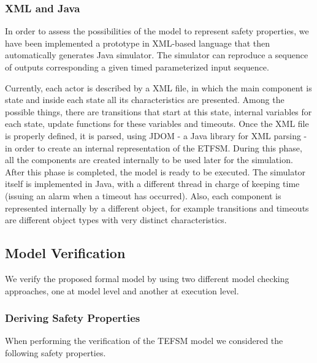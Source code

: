 \documentclass{template/openetcs_article}
\begin{document}
\subsubsection{XML and Java}

In order to assess the possibilities of the model to represent safety properties, we have been implemented a prototype in XML-based language that then automatically generates Java simulator.
%
The simulator can reproduce a sequence of outputs corresponding a given timed parameterized input sequence. 

Currently, each actor is described by a XML file, in which the main component is state and inside each state all its characteristics are presented. Among the possible things, there are transitions that start at this state, internal variables for each state, update functions for these variables and timeouts.  
Once the XML file is properly defined, it is parsed, using JDOM - a Java library for XML parsing -  in order to create an internal representation of the ETFSM. During this phase, all the components are created internally to be used later for the simulation. After this phase is completed, the model is ready to be executed. The simulator itself is implemented in Java, with a different thread in charge of keeping time (issuing an alarm when a timeout has occurred). Also, each component is represented internally by a different object, for example transitions and timeouts are different object types with very distinct characteristics. 

\subsection{Model Verification}
\label{sec:model-checking}

We verify the proposed formal model by using two different model checking approaches, one at model level and another at execution level.


\subsubsection{Deriving Safety Properties}
\label{subsec3.1}

When performing the verification of the TEFSM model we considered the following safety properties.
\end{document}
